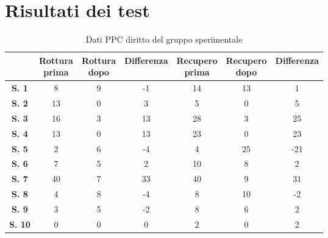 \chapter{Risultati dei test}

\begin{table}[H]
\begin{center}
\begin{tabular}{|c|c|c|c|c|c|c|} \hline
{\textbf{}} & \pbox{20cm}{\textbf{Rottura} \\ \textbf{prima}} & \pbox{20cm}{\textbf{Rottura} \\ \textbf{dopo}} & \textbf{Differenza} & \pbox{20cm}{\textbf{Recupero} \\ \textbf{prima}} & \pbox{20cm}{\textbf{Recupero} \\ \textbf{dopo}} & \textbf{Differenza} \\ \hline
\textbf{S. 1} & 8 & 9 & -1 & 14 & 13 & 1 \\ \hline
\textbf{S. 2} & 13 & 0 & 3 & 5 & 0 & 5 \\ \hline
\textbf{S. 3} & 16 & 3 & 13 & 28 & 3 & 25  \\ \hline
\textbf{S. 4} & 13 & 0 & 13 & 23 & 0 & 23  \\ \hline
\textbf{S. 5} & 2 & 6 & -4 & 4 & 25 & -21  \\ \hline
\textbf{S. 6} & 7 & 5 & 2 & 10 & 8 & 2 \\ \hline
\textbf{S. 7} & 40 & 7 & 33 & 40 & 9 & 31 \\ \hline
\textbf{S. 8} & 4 & 8 & -4 & 8 & 10 & -2  \\ \hline
\textbf{S. 9} & 3 & 5 & -2 & 8 & 6 & 2 \\ \hline
\textbf{S. 10} & 0 & 0 & 0 & 2 & 0 & 2 \\ \hline

\end{tabular}
\end{center}
\caption{Dati PPC diritto del gruppo sperimentale}
\end{table}
\\\ \\\ \\\ \\\ \\\ \\\ \\\ \\\ \\\ \\\ \\\ \\\ \\\ \\\

